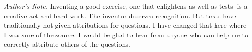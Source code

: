 {\vfill
\par\noindent\textit{Author's Note.}
Inventing a good exercise, one that enlightens as well as tests, 
is a creative act and hard work.
The inventor deserves recognition.
But texts have traditionally not given attributions for
questions.
I have changed that here where I was sure of the source.
I would be glad to hear from anyone who can help me to correctly
attribute others of the questions.   
} %
